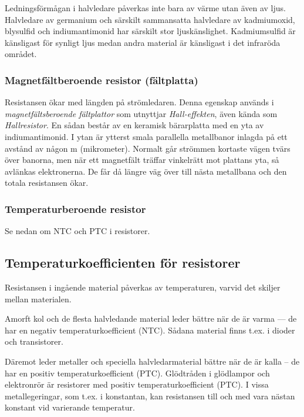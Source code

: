 Ledningsförmågan i halvledare påverkas inte bara av värme utan även av ljus.
Halvledare av germanium och särskilt sammansatta halvledare av kadmiumoxid,
blysulfid och indiumantimonid har särskilt stor ljuskänslighet. Kadmiumsulfid
är känsligast för synligt ljus medan andra material är känsligast i det
infraröda området.

\subsubsection{Magnetfältberoende resistor (fältplatta)}

Resistansen ökar med längden på strömledaren. Denna egenskap används i
\emph{magnetfältsberoende fältplattor} som utnyttjar \emph{Hall-effekten}, även
kända som \emph{Hallresistor}. En sådan består av en keramisk bärarplatta med
en yta av indiumantimonid. I ytan är ytterst smala parallella metallbanor
inlagda på ett avstånd av någon \textmu m (mikrometer). Normalt går strömmen kortaste vägen
tvärs över banorna, men när ett magnetfält träffar vinkelrätt mot plattans yta,
så avlänkas elektronerna. De får då längre väg över till nästa metallbana och
den totala resistansen ökar.

\subsubsection{Temperaturberoende resistor}

Se nedan om NTC och PTC i resistorer.

\subsection{Temperaturkoefficienten för resistorer}

Resistansen i ingående material påverkas av temperaturen, varvid det skiljer
mellan materialen.

Amorft kol och de flesta halvledande material leder bättre när de är varma --- de
har en negativ temperaturkoefficient (NTC). Sådana material finns t.ex. i
dioder och transistorer.

Däremot leder metaller och speciella halvledarmaterial bättre när de är kalla
-- de har en positiv temperaturkoefficient (PTC). Glödtråden i glödlampor och
elektronrör är resistorer med positiv temperaturkoefficient (PTC). I vissa
metallegeringar, som t.ex. i konstantan, kan resistansen till och med vara
nästan konstant vid varierande temperatur.

